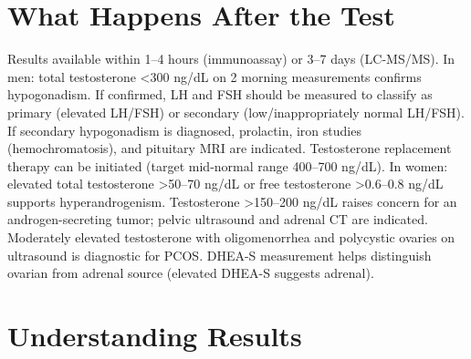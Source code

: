 \section*{What Happens After the Test}
Results available within 1--4 hours (immunoassay) or 3--7 days (LC-MS/MS). In men: total testosterone <300 ng/dL on 2 morning measurements confirms hypogonadism. If confirmed, LH and FSH should be measured to classify as primary (elevated LH/FSH) or secondary (low/inappropriately normal LH/FSH). If secondary hypogonadism is diagnosed, prolactin, iron studies (hemochromatosis), and pituitary MRI are indicated. Testosterone replacement therapy can be initiated (target mid-normal range 400--700 ng/dL). In women: elevated total testosterone >50--70 ng/dL or free testosterone >0.6--0.8 ng/dL supports hyperandrogenism. Testosterone >150--200 ng/dL raises concern for an androgen-secreting tumor; pelvic ultrasound and adrenal CT are indicated. Moderately elevated testosterone with oligomenorrhea and polycystic ovaries on ultrasound is diagnostic for PCOS. DHEA-S measurement helps distinguish ovarian from adrenal source (elevated DHEA-S suggests adrenal).

\section*{Understanding Results}

